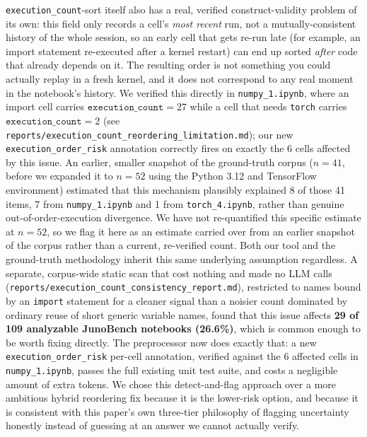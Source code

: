 \documentclass[11pt]{article}
\begin{document}
\texttt{execution\_count}-sort
itself also has a real, verified construct-validity problem of its own:
this field only records a cell's \emph{most recent} run, not a
mutually-consistent history of the whole session, so an early cell that
gets re-run late (for example, an import statement re-executed after a
kernel restart) can end up sorted \emph{after} code that already depends
on it. The resulting order is not something you could actually replay in
a fresh kernel, and it does not correspond to any real moment in the
notebook's history. We verified this directly in \texttt{numpy\_1.ipynb},
where an import cell carries $\texttt{execution\_count}{=}27$ while a
cell that needs \texttt{torch} carries $\texttt{execution\_count}{=}2$
(see \texttt{reports/execution\_count\_reordering\_limitation.md}); our
new \texttt{execution\_order\_risk} annotation correctly fires on exactly
the 6 cells affected by this issue. An earlier, smaller snapshot of the
ground-truth corpus ($n{=}41$, before we expanded it to $n{=}52$ using
the Python 3.12 and TensorFlow environment) estimated that this mechanism
plausibly explained 8 of those 41 items, 7 from \texttt{numpy\_1.ipynb}
and 1 from \texttt{torch\_4.ipynb}, rather than genuine
out-of-order-execution divergence. We have not re-quantified this
specific estimate at $n{=}52$, so we flag it here as an estimate carried
over from an earlier snapshot of the corpus rather than a current,
re-verified count. Both our tool and the ground-truth methodology inherit
this same underlying assumption regardless. A separate, corpus-wide
static scan that cost nothing and made no LLM calls
(\texttt{reports/execution\_count\_consistency\_report.md}), restricted
to names bound by an \texttt{import} statement for a cleaner signal than
a noisier count dominated by ordinary reuse of short generic variable
names, found that this issue affects \textbf{29 of 109 analyzable
JunoBench notebooks (26.6\%)}, which is common enough to be worth fixing
directly. The preprocessor now does exactly that: a new
\texttt{execution\_order\_risk} per-cell annotation, verified against the
6 affected cells in \texttt{numpy\_1.ipynb}, passes the full existing
unit test suite, and costs a negligible amount of extra tokens. We chose
this detect-and-flag approach over a more ambitious hybrid reordering fix
because it is the lower-risk option, and because it is consistent with
this paper's own three-tier philosophy of flagging uncertainty honestly
instead of guessing at an answer we cannot actually verify.
\end{document}
